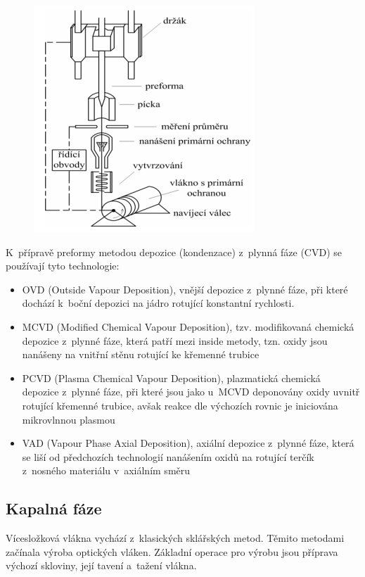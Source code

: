 \begin{figure}[!ht]
  \begin{center}
    \includegraphics[scale=1]{obrazky/preforma.png}
  \end{center}
\end{figure}

K~přípravě preformy metodou depozice (kondenzace) z~plynná fáze (CVD) se používají tyto technologie:
\begin{itemize}
  \item OVD (Outside Vapour Deposition), vnější depozice z~plynné fáze, při které dochází k~boční depozici na jádro rotující konstantní rychlosti.
  \item MCVD (Modified Chemical Vapour Deposition), tzv. modifikovaná chemická depozice z~plynné fáze, která patří mezi inside metody, tzn. oxidy jsou nanášeny na vnitřní stěnu rotující ke křemenné trubice
  \item PCVD (Plasma Chemical Vapour Deposition), plazmatická chemická depozice z~plynné fáze, při které jsou jako u~MCVD deponovány oxidy uvnitř rotující křemenné trubice, avšak reakce dle výchozích rovnic je iniciována mikrovlnnou plasmou
  \item VAD (Vapour Phase Axial Deposition), axiální depozice z~plynné fáze, která se liší od předchozích technologií nanášením oxidů na rotující terčík z~nosného materiálu v~axiálním směru
\end{itemize}

\subsection{Kapalná fáze}
Vícesložková vlákna vychází z~klasických sklářských metod. Těmito metodami začínala výroba optických vláken. Základní operace pro výrobu jsou příprava výchozí skloviny, její tavení a~tažení vlákna.

